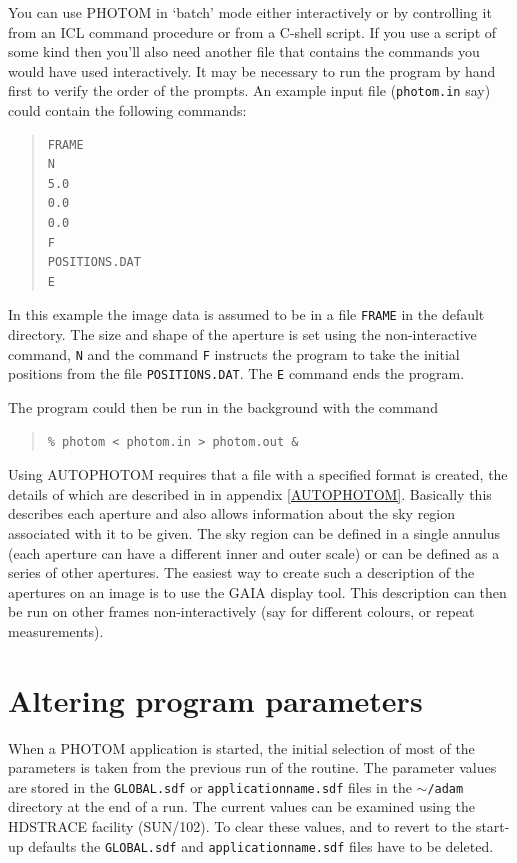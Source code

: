 \documentclass[twoside,11pt]{article}
\newcommand{\hyperref}[4]{#2\ref{#4}#3}
\newcommand{\htmlref}[2]{#1}
\newcommand{\latex}[1]{#1}
\newcommand{\xref}[3]{#1}
\newcommand{\xlabel}[1]{}
\renewcommand{\_}{\texttt{\symbol{95}}}
\begin{document}
You can use PHOTOM in `batch' mode either interactively or by
controlling it from an ICL command procedure or from a C-shell script.
If you use a script of some kind then you'll also need another file
that contains the commands you would have used interactively.  It may be
necessary to run the program by hand first to verify the order of the
prompts. An example input file (\texttt{photom.in} say) could contain the
following commands:
\begin{quote}
\begin{verbatim}
FRAME
N
5.0
0.0
0.0
F
POSITIONS.DAT
E
\end{verbatim}
\end{quote}
In this example the image data is assumed to be in a file \texttt{FRAME}
in the default directory. The size and shape of the aperture is set
using the non-interactive command, \texttt{N} and the command \texttt{F}
instructs the program to take the initial positions from the file
\texttt{POSITIONS.DAT}. The \texttt{E} command ends the program.

The program could then be run in the background with the command
\begin{quote}
\begin{verbatim}
% photom < photom.in > photom.out &
\end{verbatim}
\end{quote}

Using \htmlref{AUTOPHOTOM}{AUTOPHOTOM} requires that a file with a
specified format is created, the details of which are described in
\hyperref{this appendix}{in appendix }{}{AUTOPHOTOM}.
Basically this
describes each aperture and also allows information about the sky
region associated with it to be given. The sky region can be defined
in a single annulus (each aperture can have a different inner and
outer scale) or can be defined as a series of other apertures. The
easiest way to create such a description of the apertures on an image
is to use the GAIA display tool. This description can then be run on
other frames non-interactively (say for different colours, or repeat
measurements).


\section{\xlabel{altering_program_parameters}Altering program parameters}

When a PHOTOM application is started, the initial selection of most of
the parameters is taken from the previous run of the routine. The
parameter values are stored in the \texttt{GLOBAL.sdf} or
\texttt{application\_name.sdf} files in the \texttt{$\sim$/adam} directory at the
end of a run. The current values can be examined using the
\xref{HDSTRACE}{sun102}{} facility \latex{(SUN/102)}. To clear these
values, and to revert to the start-up defaults the \texttt{GLOBAL.sdf}
and \texttt{application\_name.sdf} files have to be deleted.
\end{document}
